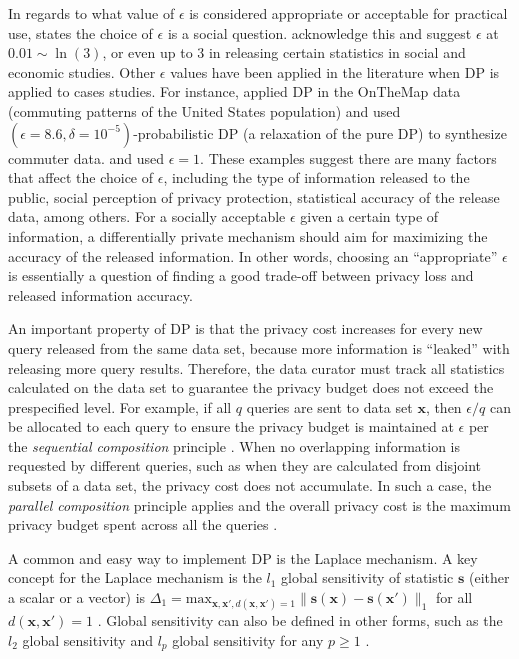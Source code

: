 \documentclass[12pt, A4]{article}
\newcommand{\x}{\mathbf{x}}
\newcommand{\s}{\mathbf{s}}
\theoremstyle{plain}
\theoremstyle{exampstyle}\newtheorem{defn}{Definition}
\theoremstyle{exampstyle}\newtheorem{lem}{Lemma}
\theoremstyle{exampstyle}\newtheorem{cor}{Corollary}
\theoremstyle{exampstyle}\newtheorem{pro}{Proposition}
\theoremstyle{exampstyle}\newtheorem{cla}{Claim}
\theoremstyle{exampstyle}\newtheorem{rem}{Remark}
\begin{document}
In regards to what value of $\epsilon$ is considered appropriate or acceptable for practical use, \citet{dwork2008survey} states the choice of $\epsilon$ is a social question. \citet{abowd2015revisiting} acknowledge this and suggest $\epsilon$ at $0.01\sim \ln(3)$, or even up to 3 in releasing certain statistics in social and economic studies. Other $\epsilon$ values have been applied in the literature when DP is applied to cases studies. For instance, \citet{machanavajjhala2008privacy} applied DP in the OnTheMap data (commuting patterns of the United States population) and used $(\epsilon=8.6,\delta=10^{-5})$-probabilistic DP (a relaxation of the pure DP) to synthesize commuter data. \citet{DPcube} and \citet{DPcopula} used $\epsilon=1$. These examples suggest there are many factors that affect the choice of $\epsilon$, including the type of information released to the public, social perception of privacy protection, statistical accuracy of the release data, among others. For a socially acceptable $\epsilon$ given a certain type of information, a differentially private mechanism should aim for maximizing the accuracy of the released information. In other words, choosing an ``appropriate'' $\epsilon$ is essentially a question of finding a good trade-off between privacy loss and released information accuracy.

An important property of DP is that the privacy cost increases for every new query released from the same data set, because more information is ``leaked'' with releasing more query results. Therefore, the data curator must track all statistics calculated on the data set to guarantee the privacy budget does not exceed the prespecified level. For example, if all $q$ queries are sent to data set $\x$, then $\epsilon/q$ can be allocated to each query to ensure the privacy budget is maintained at $\epsilon$ per the \textit{sequential composition} principle \citep{mcsherry2009privacy}. When no overlapping information is requested by different queries, such as when they are calculated from disjoint subsets of a data set, the privacy cost does not accumulate. In such a case, the \textit{parallel composition} principle applies and the overall privacy cost is the maximum privacy budget spent across all the queries \citep{mcsherry2009privacy}.

A common and easy way to implement DP is the Laplace mechanism. A key concept for the Laplace mechanism is the $l_1$ global sensitivity of statistic $\s$ (either a scalar or a vector) is $\Delta_1=\mbox{max}_{\x,\x', d(\x,\x')=1} \|\s(\x)-\s(\x')\|_1$ for all $d(\x,\x')=1$ \citep{dwork2006calibrating}. Global sensitivity can also be defined in other forms, such as the $l_2$ global sensitivity \citep{dwork2013algorithmic} and $l_p$ global sensitivity for any $p\ge1$ \citep{liu2016generalized}.
\end{document}
